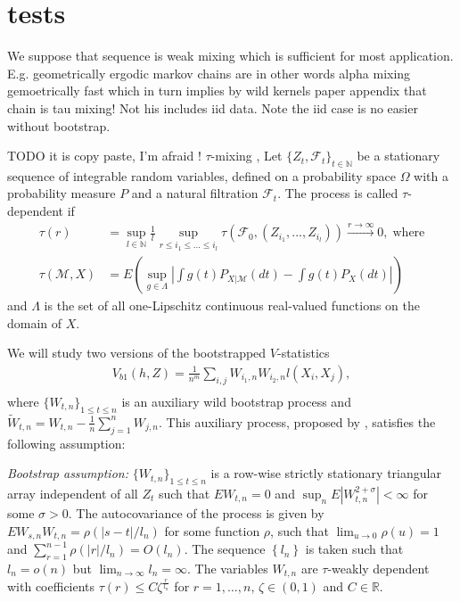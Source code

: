 \documentclass{article}
\begin{document}
\section{tests}
We suppose that sequence is weak mixing which is sufficient for most application. E.g. geometrically ergodic  markov chains are in other words alpha mixing gemoetrically fast which in turn implies by wild kernels paper appendix that chain is tau mixing!   Not his includes iid data. Note the iid case is no easier without bootstrap.



TODO it is copy paste, I'm afraid !
 $\tau$-mixing \cite{dedecker2007weak}, 
Let $\{Z_t,\mathcal{F}_t\}_{t \in \mathbb{N}}$  be a stationary sequence of integrable random variables, defined on a probability space $\Omega$ with a probability measure $P$ and a natural filtration $\mathcal{F}_t$. The process  is called $\tau$-dependent if 
\begin{align*}
\tau(r) &= \sup_{l \in \mathbb{N}} \frac 1 l \sup_{ r \leq i_1 \leq ... \leq i_l} \tau( \mathcal F_0,(Z_{i_1},...,Z_{i_l}) )  \overset{r \to \infty}{\longrightarrow} 0,\;\text{where} \\
\tau(\mathcal{M},X) &=  E \left( \sup_{g \in \Lambda} \left| \int g(t) P_{X|\mathcal{M}}(dt) - \int g(t) P_X(dt) \right| \right)
\end{align*}
and $\Lambda$ is the set of all one-Lipschitz continuous real-valued functions on the domain of $X$. 

We will study two versions of the bootstrapped $V$-statistics  
\begin{align}
 V_{b1}(h,Z) = \frac{1}{n^m} \sum_{i,j} \nolimits W_{i_1,n} W_{i_2,n} l(X_i,X_j), \label{Vb1}\\ 
\end{align}
where $\{W_{t,n}\}_{1 \leq t \leq n }$ is an auxiliary wild bootstrap process and $\tilde W_{t,n} = W_{t,n} - \frac 1 n \sum_{j=1}^n W_{j,n}$. This auxiliary process, proposed by \cite{Shao2010,leucht_dependent_2013}, satisfies the following assumption:

\emph{Bootstrap assumption:} $\{W_{t,n}\}_{1 \leq t \leq n }$ is a row-wise strictly stationary triangular array independent of all $Z_t$ such that $E W_{t,n}=0$ and $\sup_{n} E|W_{t,n}^{2+\sigma}| < \infty$ for some $\sigma > 0$. The autocovariance of the process is given by $E W_{s,n} W_{t,n}=\rho(|s-t|/l_n)$ for some function $\rho$, such that $\lim_{u \to 0} \rho(u) = 1$ and $\sum_{r=1}^{n-1} \rho(|r|/l_n)= O(l_n)$. The sequence $\left\{l_n\right\}$ is taken such that $l_n=o(n)$ but $\lim_{n \to \infty} l_n = \infty$. The variables $W_{t,n}$  are $\tau$-weakly dependent with coefficients $\tau(r) \leq C \zeta^{\frac{r} {l_n}}$ for $r=1,...,n$, $\zeta \in (0,1)$ and $C\in\mathbb R$.
\end{document}
